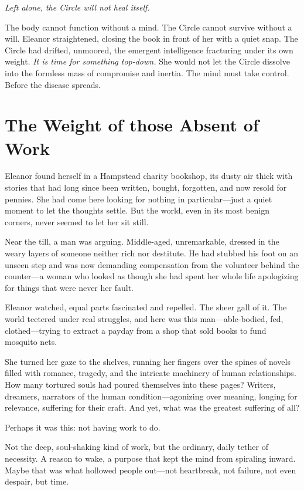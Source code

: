 \smallskip

\textit{Left alone, the Circle will not heal itself.}  

\smallskip

The body cannot function without a mind. The Circle cannot survive without a will. Eleanor straightened, closing the book in front of her with a quiet snap.  The Circle had drifted, unmoored, the emergent intelligence fracturing under its own weight.  \textit{It is time for something top-down.}  She would not let the Circle dissolve into the formless mass of compromise and inertia.  The mind must take control.  Before the disease spreads.  

\newpage
\section*{The Weight of those Absent of Work}

Eleanor found herself in a Hampstead charity bookshop, its dusty air thick with stories that had long since been written, bought, forgotten, and now resold for pennies. She had come here looking for nothing in particular—just a quiet moment to let the thoughts settle. But the world, even in its most benign corners, never seemed to let her sit still.

Near the till, a man was arguing. Middle-aged, unremarkable, dressed in the weary layers of someone neither rich nor destitute. He had stubbed his foot on an unseen step and was now demanding compensation from the volunteer behind the counter—a woman who looked as though she had spent her whole life apologizing for things that were never her fault.

Eleanor watched, equal parts fascinated and repelled. The sheer gall of it. The world teetered under real struggles, and here was this man—able-bodied, fed, clothed—trying to extract a payday from a shop that sold books to fund mosquito nets.

She turned her gaze to the shelves, running her fingers over the spines of novels filled with romance, tragedy, and the intricate machinery of human relationships. How many tortured souls had poured themselves into these pages? Writers, dreamers, narrators of the human condition—agonizing over meaning, longing for relevance, suffering for their craft. And yet, what was the greatest suffering of all?

Perhaps it was this: not having work to do.

Not the deep, soul-shaking kind of work, but the ordinary, daily tether of necessity. A reason to wake, a purpose that kept the mind from spiraling inward. Maybe that was what hollowed people out—not heartbreak, not failure, not even despair, but time.


